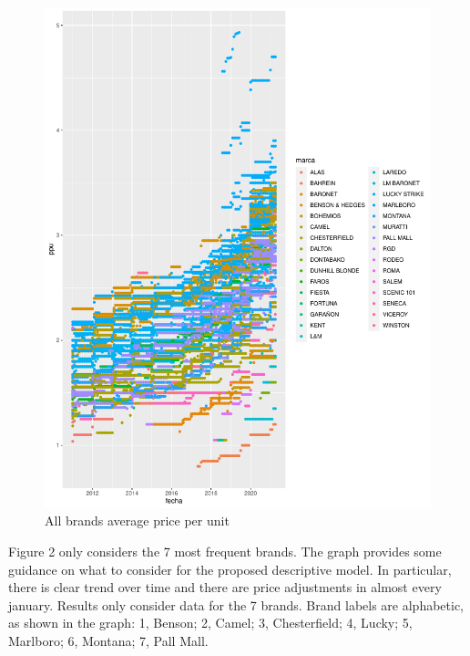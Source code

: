 \documentclass[]{article}
\begin{document}
\begin{figure}
\begin{center}
	\includegraphics[width=\textwidth]{df_review_ppu_marcas.pdf} 
\end{center}
 \caption{All brands average price per unit}
\end{figure}

Figure 2 only considers the 7 most frequent brands. The graph provides some guidance on what to consider for the proposed descriptive model.  In particular, there is clear trend over time and there are price adjustments in almost every january. 
Results only consider data for the 7 brands. Brand labels are alphabetic, as shown in the graph: 1, Benson; 2, Camel; 3, Chesterfield; 4, Lucky; 5, Marlboro; 6, Montana; 7, Pall Mall.
\end{document}
